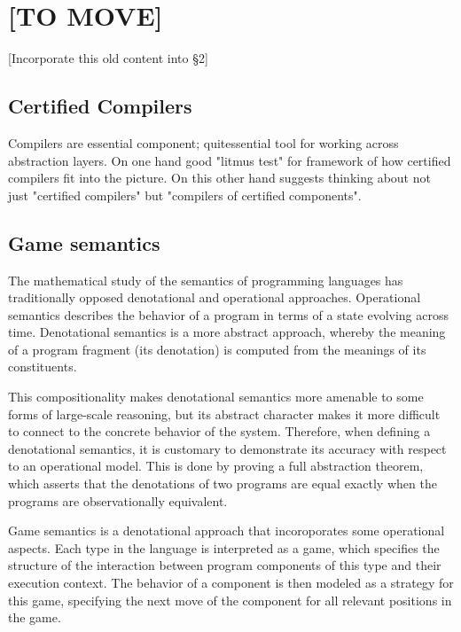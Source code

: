 \documentclass[acmsmall,timestamp,review]{acmart}
\begin{document}


\section*{[TO MOVE]} %

[Incorporate this old content into \S2]

\subsection{Certified Compilers} %

Compilers are essential component;
quitessential tool for working across abstraction layers.
On one hand good "litmus test" for framework
of how certified compilers fit into the picture.
On this other hand suggests thinking about not just
"certified compilers" but "compilers of certified components".


\subsection{Game semantics} %

The mathematical study of the semantics of programming languages
has traditionally opposed denotational and operational approaches.
Operational semantics describes
the behavior of a program in terms of
a state evolving across time.
Denotational semantics is a more abstract approach,
whereby the meaning of a program fragment (its denotation)
is computed from the meanings of its constituents.

This compositionality makes denotational semantics
more amenable to some forms of large-scale reasoning,
but its abstract character makes it more difficult
to connect to the concrete behavior of the system.
Therefore, when defining a denotational semantics,
it is customary to demonstrate its accuracy
with respect to an operational model.
This is done by proving a full abstraction theorem,
which asserts that the denotations of two programs
are equal exactly when the programs are observationally equivalent.

Game semantics is a denotational approach that
incoroporates some operational aspects.
Each type in the language
is interpreted as a game,
which specifies the structure of the interaction
between program components of this type
and their execution context.
The behavior of a component
is then modeled as a strategy for this game,
specifying the next move of the component
for all relevant positions in the game.
\end{document}
